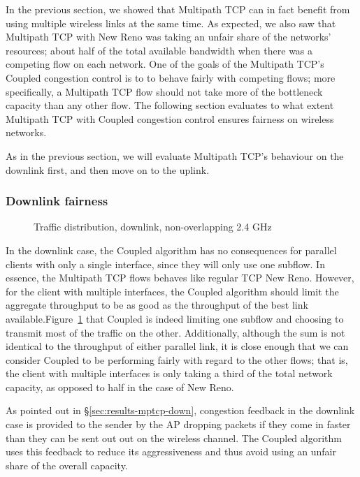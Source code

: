 In the previous section, we showed that Multipath TCP can in fact benefit from
using multiple wireless links at the same time. As expected, we also saw that
Multipath TCP with New Reno was taking an unfair share of the networks'
resources; about half of the total available bandwidth when there was a
competing flow on each network. One of the goals of the Multipath TCP's Coupled
congestion control is to to behave fairly with competing flows; more
specifically, a Multipath TCP flow should not take more of the bottleneck
capacity than any other flow. The following section evaluates to what extent
Multipath TCP with Coupled congestion control ensures fairness on wireless
networks.

As in the previous section, we will evaluate Multipath TCP's behaviour on the
downlink first, and then move on to the uplink.

\subsubsection{Downlink fairness}

\begin{figure}[h]
 \centering
 
 \caption{Traffic distribution, downlink, non-overlapping 2.4 GHz}\label{graph:down-fair}
\end{figure}

In the downlink case, the Coupled algorithm has no consequences for parallel
clients with only a single interface, since they will only use one subflow. In
essence, the Multipath TCP flows behaves like regular TCP New Reno. However, for
the client with multiple interfaces, the Coupled algorithm should limit the
aggregate throughput to be as good as the throughput of the best link
available.\@ Figure~\ref{graph:down-fair} that Coupled is indeed limiting one
subflow and choosing to transmit most of the traffic on the other. Additionally,
although the sum is not identical to the throughput of either parallel link, it
is close enough that we can consider Coupled to be performing fairly with regard
to the other flows; that is, the client with multiple interfaces is only taking
a third of the total network capacity, as opposed to half in the case of New
Reno.


As pointed out in \S\ref{sec:results-mptcp-down}, congestion feedback in
the downlink case is provided to the sender by the AP dropping packets if they
come in faster than they can be sent out out on the wireless channel. The
Coupled algorithm uses this feedback to reduce its aggressiveness and thus avoid
using an unfair share of the overall capacity.

